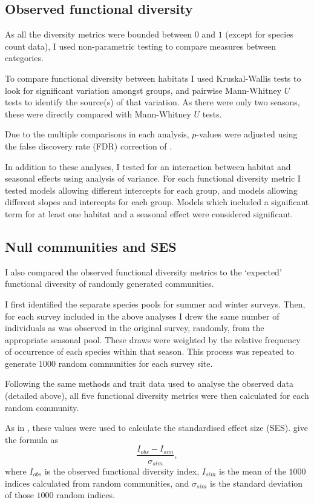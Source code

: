 \documentclass[12pt,a4paper]{book}
\begin{document}
\subsection{Observed functional diversity}

As all the diversity metrics were bounded between $0$ and $1$ (except for species count data), I used non-parametric testing to compare measures between categories. 

To compare functional diversity between habitats I used Kruskal-Wallis tests to look for significant variation amongst groups, and pairwise Mann-Whitney $U$ tests to identify the source(s) of that variation. As there were only two seasons, these were directly compared with Mann-Whitney $U$ tests.

Due to the multiple comparisons in each analysis, $p$-values were adjusted using the false discovery rate (FDR) correction of \citet{Benjamini1995}.

In addition to these analyses, I tested for an interaction between habitat and seasonal effects using analysis of variance. For each functional diversity metric I tested models allowing different intercepts for each group, and models allowing different slopes and intercepts for each group. Models which included a significant term for at least one habitat and a seasonal effect were considered significant.

\subsection{Null communities and SES}

I also compared the observed functional diversity metrics to the `expected' functional diversity of randomly generated communities.

I first identified the separate species pools for summer and winter surveys. Then, for each survey included in the above analyses I drew the same number of individuals as was observed in the original survey, randomly, from the appropriate seasonal pool. These draws were weighted by the relative frequency of occurrence of each species within that season. This process was repeated to generate $1000$ random communities for each survey site.

Following the same methods and trait data used to analyse the observed data (detailed above), all five functional diversity metrics were then calculated for each random community.

As in \citet{Mendez2012}, these values were used to calculate the standardised effect size (SES). \citet{Gotelli2002} give the formula as
\begin{equation}
\frac{I_{obs} - I_{sim}}{\sigma_{sim}},
\end{equation}
where $I_{obs}$ is the observed functional diversity index, $I_{sim}$ is the mean of the $1000$ indices calculated from random communities, and $\sigma_{sim}$ is the standard deviation of those $1000$ random indices.
\end{document}
